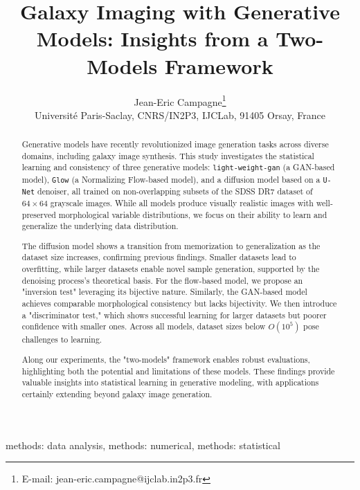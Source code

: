 \documentclass[fleqn,usenatbib]{mnras}
\title[Galaxy Imaging with Generative Models]{Galaxy Imaging with Generative Models: Insights from a Two-Models Framework}
\author[J.E Campagne]{
 Jean-Eric Campagne\thanks{E-mail: jean-eric.campagne@ijclab.in2p3.fr}\orcidlink{0000-0002-1590-6927}\\
 Université Paris-Saclay, CNRS/IN2P3, IJCLab,  91405 Orsay, France
}
\begin{document}
\label{firstpage}
\pagerange{\pageref{firstpage}--\pageref{lastpage}}
\maketitle

\begin{abstract}
Generative models have recently revolutionized image generation tasks across diverse domains, including galaxy image synthesis. This study investigates the statistical learning and consistency of three generative models: \texttt{light-weight-gan} (a GAN-based model), \texttt{Glow} (a Normalizing Flow-based model), and a diffusion model based on a \texttt{U-Net} denoiser, all trained on non-overlapping subsets of the SDSS DR7 dataset of $64 \times 64$ grayscale images. While all models produce visually realistic images with well-preserved morphological variable distributions, we focus on their ability to learn and generalize the underlying data distribution.

The diffusion model shows a transition from memorization to generalization as the dataset size increases, confirming previous findings. Smaller datasets lead to overfitting, while larger datasets enable novel sample generation, supported by the denoising process's theoretical basis. For the flow-based model, we propose an "inversion test" leveraging its bijective nature. Similarly, the GAN-based model achieves comparable morphological consistency but lacks bijectivity. We then introduce a "discriminator test," which shows successful learning for larger datasets but poorer confidence with smaller ones. Across all models, dataset sizes below $O(10^5)$ pose challenges to learning.

Along our experiments, the "two-models" framework enables robust evaluations, highlighting both the potential and limitations of these models. These findings provide valuable insights into statistical learning in generative modeling, with applications certainly extending beyond galaxy image generation.
\end{abstract}


\begin{keywords}
methods: data analysis, methods: numerical, methods: statistical
\end{keywords}
\end{document}
